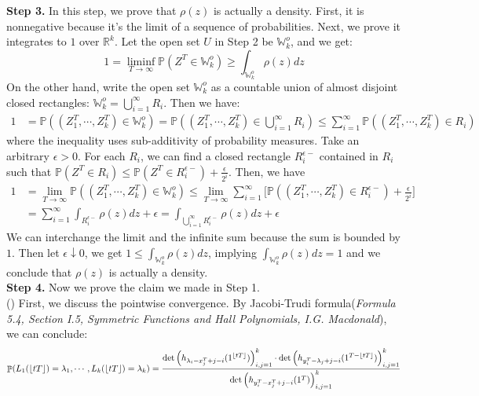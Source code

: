 \documentclass[12pt]{article}
\DeclareMathOperator{\pr}{\mathbb{P}}
\DeclarePairedDelimiter\floor{\lfloor}{\rfloor}
\begin{document}
\textbf{Step 3. }In this step, we prove that $\rho(z)$ is actually a density. First, it is nonnegative because it's the limit of a sequence of probabilities. Next, we prove it integrates to $1$ over $\mathbb{R}^{k}$. Let the open set $U$ in Step 2 be $\mathbb{W}_{k}^{o}$, and we get: $$1=\liminf_{T\rightarrow\infty}\mathbb{P}(Z^{T}\in \mathbb{W}_{k}^{o})\geqslant \int_{\mathbb{W}_{k}^{o}}\rho(z)dz$$
On the other hand, write the open set $\mathbb{W}_{k}^{o}$ as a countable union of almost disjoint closed rectangles: $\mathbb{W}_{k}^{o}=\bigcup_{i=1}^{\infty}R_{i}$. Then we have:
\begin{align*}
	1&=\mathbb{P}((Z_{1}^{T},\cdots,Z_{k}^{T})\in \mathbb{W}_{k}^{o})=\mathbb{P}((Z_{1}^{T},\cdots,Z_{k}^{T})\in \bigcup_{i=1}^{\infty}R_{i})\leqslant\sum_{i=1}^{\infty}\mathbb{P}((Z_{1}^{T},\cdots,Z_{k}^{T})\in R_{i})
\end{align*}
where the inequality uses sub-additivity of probability measures. Take an arbitrary $\epsilon>0$. For each $R_{i}$, we can find a closed rectangle $R_{i}^{\epsilon-}$ contained in $R_{i}$ such that $\mathbb{P}(Z^{T}\in R_{i})\leqslant \mathbb{P}(Z^{T}\in R_{i}^{\epsilon-})+\frac{\epsilon}{2^{i}}$. Then, we have
\begin{align*}
	1&=\lim_{T\rightarrow\infty}\mathbb{P}((Z_{1}^{T},\cdots,Z_{k}^{T})\in \mathbb{W}_{k}^{o})\leqslant \lim_{T\rightarrow\infty}\sum_{i=1}^{\infty}\big[\mathbb{P}((Z_{1}^{T},\cdots,Z_{k}^{T})\in R_{i}^{\epsilon-})+\frac{\epsilon}{2^{i}}\big]\\
	&=\sum_{i=1}^{\infty}\int_{R_{i}^{\epsilon-}}\rho(z)dz+\epsilon=\int_{\bigcup_{i=1}^{\infty}R_{i}^{\epsilon-}}\rho(z)dz+\epsilon
\end{align*}
We can interchange the limit and the infinite sum because the sum is bounded by $1$. Then let $\epsilon\downarrow 0$, we get $1\leqslant\int_{\mathbb{W}_{k}^{o}}\rho(z)dz$, implying $\int_{\mathbb{W}_{k}^{o}}\rho(z)dz=1$ and we conclude that $\rho(z)$ is actually a density.\\
\textbf{Step 4. }Now we prove the claim we made in Step 1. \\
() First, we discuss the pointwise convergence. By Jacobi-Trudi formula(\emph{Formula 5.4, Section I.5, Symmetric Functions and Hall Polynomials, I.G. Macdonald}), we can conclude:
\begin{align*}
\pr(L_1(\lfloor tT\rfloor)=\lambda_1,\cdots, L_k(\lfloor tT\rfloor)=\lambda_k)=\frac{\det\left(h_{\lambda_i-x_j^T+j-i}(1^{\floor{tT}})\right)_{i,j=1}^k\cdot\det\left(h_{y_i^T-\lambda_j+j-i}(1^{T-\floor{tT}})\right)_{i,j=1}^k}{\det\left(h_{y_i^{T}-x_j^T+j-i}(1^T)\right)_{i,j=1}^k}	
\end{align*}
\end{document}
